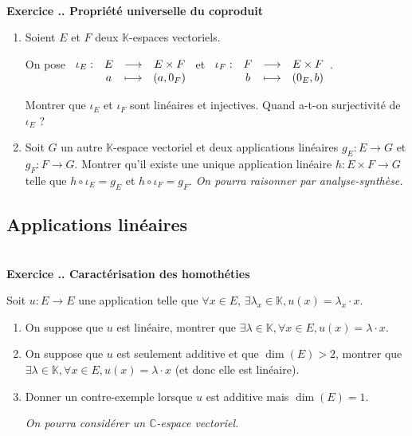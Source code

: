 \documentclass{article}
\newcommand{\fonction}[5]{\raisebox{-0.5\baselineskip}{$\begin{array}{lccc}
    #1: & #2 & \longrightarrow & #3 \\
        & #4 & \longmapsto & #5 \end{array}$}}
\newcommand{\mb}[1]{\mathbb{#1}}
\newcounter{exo}
\newcommand{\exercice}[1][\null]{\textbf{\\ Exercice \thesection.\theexo. #1} \addtocounter{exo}{1}}
\begin{document}
\exercice[Propriété universelle du coproduit]

\begin{enumerate}

\item Soient $E$ et $F$ deux $\mb{K}$-espaces vectoriels.

On pose $\fonction{\iota_E}{E}{E\times F}{a}{(a, 0_F)}$ et $\fonction{\iota_F}{F}{E\times F}{b}{(0_E, b)}$.

Montrer que $\iota_E$ et $\iota_F$ sont linéaires et injectives. Quand a-t-on surjectivité de $\iota_E$ ?

\item Soit $G$ un autre $\mb{K}$-espace vectoriel et deux applications linéaires $g_E : E \rightarrow G$ et $g_F : F \rightarrow G$. Montrer qu'il existe une unique application linéaire $h : E \times F \rightarrow G$ telle que $h \circ \iota_E = g_E$ et $h \circ \iota_F= g_F$.  \emph{On pourra raisonner par analyse-synthèse.}

\end{enumerate}



\subsection{Applications linéaires}


\exercice[Caractérisation des homothéties] 

Soit $u : E \rightarrow E$ une application telle que $\forall x \in E$, $\exists \lambda_x \in \mb{K}, u(x) = \lambda_x \cdot x$.

\begin{enumerate}

\item On suppose que $u$ est linéaire, montrer que $\exists \lambda \in \mb{K}, \forall x \in E, u(x) = \lambda \cdot x$.

\item On suppose que $u$ est seulement additive et que $\dim(E) > 2$, montrer que $\exists \lambda \in \mb{K}, \forall x \in E, u(x) = \lambda \cdot x$ (et donc elle est linéaire).

\item Donner un contre-exemple lorsque $u$ est additive mais $\dim(E) = 1$.

\emph{On pourra considérer un $\mb{C}$-espace vectoriel.}

\end{enumerate}
\end{document}
